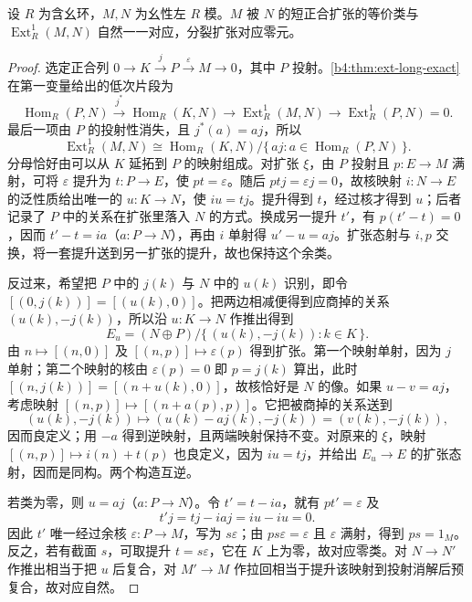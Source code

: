 \begin{theorem}\label{b4:thm:ext1-extensions}
	设 \(R\) 为含幺环，\(M,N\) 为幺性左 \(R\) 模。\(M\) 被 \(N\) 的短正合扩张的等价类与 \(\operatorname{Ext}_R^1(M,N)\) 自然一一对应，分裂扩张对应零元。
\end{theorem}
\begin{proof}
	选定正合列 \(0\to K\xrightarrow{j}P\xrightarrow{\varepsilon}M\to0\)，其中 \(P\) 投射。\cref{b4:thm:ext-long-exact}在第一变量给出的低次片段为
	\[
		\operatorname{Hom}_R(P,N)\xrightarrow{j^*}\operatorname{Hom}_R(K,N) \longrightarrow\operatorname{Ext}_R^1(M,N) \longrightarrow\operatorname{Ext}_R^1(P,N)=0.
	\]
	最后一项由 \(P\) 的投射性消失，且 \(j^*(a)=aj\)，所以
	\[
		\operatorname{Ext}_R^1(M,N) \cong\operatorname{Hom}_R(K,N)\big/\{\,a j:a\in\operatorname{Hom}_R(P,N)\,\}.
	\]
	分母恰好由可以从 \(K\) 延拓到 \(P\) 的映射组成。对扩张 \(\xi\)，由 \(P\) 投射且 \(p:E\to M\) 满射，可将 \(\varepsilon\) 提升为 \(t:P\to E\)，使 \(pt=\varepsilon\)。随后 \(ptj=\varepsilon j=0\)，故核映射 \(i:N\to E\) 的泛性质给出唯一的 \(u:K\to N\)，使 \(iu=tj\)。提升得到 \(t\)，经过核才得到 \(u\)；后者记录了 \(P\) 中的关系在扩张里落入 \(N\) 的方式。换成另一提升 \(t'\)，有 \(p(t'-t)=0\)，因而 \(t'-t=ia\)（\(a:P\to N\)），再由 \(i\) 单射得 \(u'-u=aj\)。扩张态射与 \(i,p\) 交换，将一套提升送到另一扩张的提升，故也保持这个余类。

	反过来，希望把 \(P\) 中的 \(j(k)\) 与 \(N\) 中的 \(u(k)\) 识别，即令 \([(0,j(k))]=[(u(k),0)]\)。把两边相减便得到应商掉的关系 \((u(k),-j(k))\)，所以沿 \(u:K\to N\) 作推出得到
	\[
		E_u=(N\oplus P)/\{\,(u(k),-j(k)):k\in K\,\}.
	\]
	由 \(n\mapsto[(n,0)]\) 及 \([(n,p)]\mapsto\varepsilon(p)\) 得到扩张。第一个映射单射，因为 \(j\) 单射；第二个映射的核由 \(\varepsilon(p)=0\) 即 \(p=j(k)\) 算出，此时 \([(n,j(k))]=[(n+u(k),0)]\)，故核恰好是 \(N\) 的像。如果 \(u-v=a j\)，考虑映射 \([(n,p)]\mapsto[(n+a(p),p)]\)。它把被商掉的关系送到
	\[
		(u(k),-j(k))\longmapsto(u(k)-aj(k),-j(k))=(v(k),-j(k)),
	\]
	因而良定义；用 \(-a\) 得到逆映射，且两端映射保持不变。对原来的 \(\xi\)，映射 \([(n,p)]\mapsto i(n)+t(p)\) 也良定义，因为 \(iu=tj\)，并给出 \(E_u\to E\) 的扩张态射，因而是同构。两个构造互逆。

	若类为零，则 \(u=aj\)（\(a:P\to N\)）。令 \(t'=t-ia\)，就有 \(pt'=\varepsilon\) 及
	\[
		t'j=tj-iaj=iu-iu=0.
	\]
	因此 \(t'\) 唯一经过余核 \(\varepsilon:P\to M\)，写为 \(s\varepsilon\)；由 \(ps\varepsilon=\varepsilon\) 且 \(\varepsilon\) 满射，得到 \(ps=1_M\)。反之，若有截面 \(s\)，可取提升 \(t=s\varepsilon\)，它在 \(K\) 上为零，故对应零类。对 \(N\to N'\) 作推出相当于把 \(u\) 后复合，对 \(M'\to M\) 作拉回相当于提升该映射到投射消解后预复合，故对应自然。
\end{proof}

